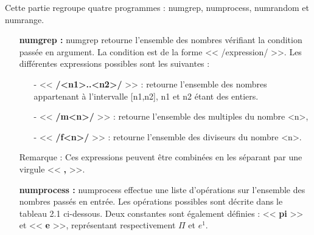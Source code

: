 Cette partie regroupe quatre programmes : numgrep, numprocess, numrandom et numrange.
\newline
\begin{itemize}
 \item[\textbullet] \textbf{numgrep :} numgrep retourne l'ensemble des nombres v\'erifiant la condition pass\'ee en argument. La condition est de la
forme << /expression/ >>. Les diff\'erentes expressions possibles sont les suivantes :
  \begin{itemize}
  \item[-] << \textbf{/<n1>..<n2>/} >> : retourne l'ensemble des nombres appartenant \`a l'intervalle [n1,n2], n1 et n2 \'etant des entiers.
  \item[-] << \textbf{/m<n>/} >> : retourne l'ensemble des multiples du nombre <n>,
  \item[-] << \textbf{/f<n>/} >> : retourne l'ensemble des diviseurs du nombre <n>.
  \end{itemize}
Remarque : Ces expressions peuvent \^etre combin\'ees en les s\'eparant par une virgule << \textbf{,} >>.
\newline{}
 \item[\textbullet] \textbf{numprocess :} numprocess effectue une liste d'op\'erations sur l'ensemble des nombres pass\'es en entr\'ee.
Les op\'erations possibles sont d\'ecrite dans le tableau 2.1 ci-dessous. Deux constantes sont \'egalement d\'efinies : << \textbf{pi} >> 
et << \textbf{e} >>, repr\'esentant respectivement $\Pi$ et $e^1$.
\begin{table}[h]
\begin{center}


\end{center}
\end{table}
\end{itemize}
